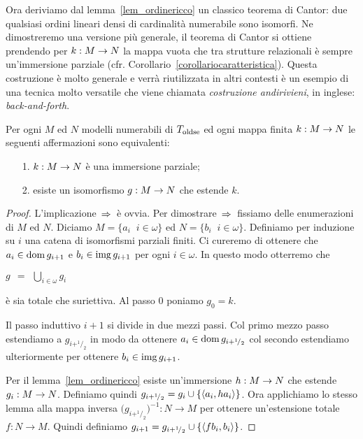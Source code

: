 Ora deriviamo dal lemma~\ref{lem_ordinericco} un classico teorema di Cantor: due qualsiasi ordini lineari densi di cardinalit\`a numerabile sono isomorfi. Ne dimostreremo una versione pi\`u generale, il teorema di Cantor si ottiene prendendo per $k:M\rightarrow N$ la mappa vuota che tra strutture relazionali \`e sempre un'immersione parziale (cfr. Corollario~\ref{corollariocaratteristica}). Questa costruzione \`e molto generale e verr\`a riutilizzata in altri contesti \`e un esempio di una tecnica molto versatile che viene chiamata \emph{costruzione andirivieni}, in inglese: \emph{back-and-forth}.

\begin{theorem}\label{zigzagcantor}
Per ogni $M$ ed $N$ modelli numerabili di $T_{\rm oldse}$ ed ogni mappa finita $k:M\rightarrow N$ le seguenti affermazioni sono equivalenti:
\begin{itemize} 
\item[1.] $k:M\rightarrow N$ \`e una immersione parziale; 
\item[2.] esiste un isomorfismo $g:M\rightarrow N$ che estende $k$.
\end{itemize}
\end{theorem}

\begin{proof}
L'implicazione $\,\Rightarrow\,$ \`e ovvia. Per dimostrare $\,\Rightarrow\,$ fissiamo delle enumerazioni di $M$ ed $N$. Diciamo $M=\{a_i\;\;i\in\omega\}$ ed $N=\{b_i\;\;i\in\omega\}$. Definiamo per induzione su $i$ una catena di isomorfismi parziali finiti. Ci cureremo di ottenere che $a_i\in\mathop{\rm dom} g_{i+1}$ e $b_i\in\mathop{\rm img} g_{i+1}$ per ogni $i\in\omega$. In questo modo otterremo che

\hfil$\displaystyle g\ \ =\ \ \bigcup_{i\in\omega}g_i$

\`e sia totale che suriettiva. Al passo $0$ poniamo $g_0=k$.

Il passo induttivo $i+1$ si divide in due mezzi passi. Col primo mezzo passo estendiamo a $g_{i+^1\!/_2}$ in modo da ottenere $a_i\in\mathop{\rm dom} g_{i+^1\!/_2}$ col secondo estendiamo ulteriormente per ottenere $b_i\in\mathop{\rm img} g_{i+1}$. 

Per il lemma~\ref{lem_ordinericco} esiste un'immersione $h:M\rightarrow N$ che estende $g_i:M\rightarrow N$. Definiamo quindi $g_{i+^1\!/_2}=g_i\cup\{\langle a_i,ha_i\rangle\}$. Ora applichiamo lo stesso lemma alla mappa inversa $\big(g_{i+^1\!/_2})^{-1}:N\to M$ per ottenere un'estensione totale $f:N\to M$. Quindi definiamo $g_{i+1}=g_{i+^1\!/_2}\cup\{\langle fb_i,b_i\rangle\}$.
\end{proof}



